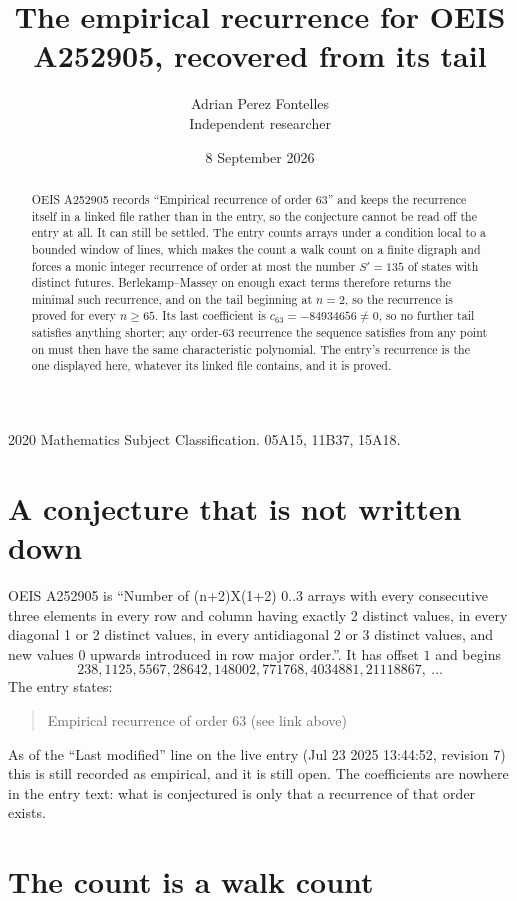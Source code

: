 \documentclass[11pt,a4paper]{article}
\title{The empirical recurrence for OEIS A252905, recovered from its tail}
\author{Adrian Perez Fontelles\\ \small Independent researcher}
\date{8 September 2026}
\theoremstyle{plain}
\theoremstyle{definition}
\begin{document}
\maketitle

\begin{abstract}
OEIS A252905 records ``Empirical recurrence of order $63$'' and keeps the recurrence itself in
a linked file rather than in the entry, so the conjecture cannot be read off the entry at all.
It can still be settled. The entry counts arrays under a condition local to a bounded window of
lines, which makes the count a walk count on a finite digraph and forces a monic integer
recurrence of order at most the number $S'=135$ of states with distinct futures. Berlekamp--Massey on
enough exact terms therefore returns the minimal such recurrence, and on the tail beginning at $n=2$, so the recurrence is proved for every $n\ge65$.
Its last coefficient is $c_{63}=-84934656\neq0$, so no further tail satisfies anything
shorter; any order-$63$ recurrence the sequence satisfies from any point on must then have
the same characteristic polynomial. The entry's recurrence is the one displayed here, whatever
its linked file contains, and it is proved.
\end{abstract}

\noindent\small 2020 Mathematics Subject Classification. 05A15, 11B37, 15A18.\normalsize

\section{A conjecture that is not written down}

OEIS A252905 is ``Number of (n+2)X(1+2) 0..3 arrays with every consecutive three elements in every row and column having exactly 2 distinct values, in every diagonal 1 or 2 distinct values, in every antidiagonal 2 or 3 distinct values, and new values 0 upwards introduced in row major order.''. It has offset $1$ and begins
\[
238, 1125, 5567, 28642, 148002, 771768, 4034881, 21118867,\ \dots
\]
The entry states:
\begin{quote}
Empirical recurrence of order 63 (see link above)
\end{quote}
As of the ``Last modified'' line on the live entry (Jul 23 2025 13:44:52, revision 7)
this is still recorded as empirical, and it is still open. The coefficients are nowhere in the
entry text: what is conjectured is only that a recurrence of that order exists.

\section{The count is a walk count}
\end{document}
